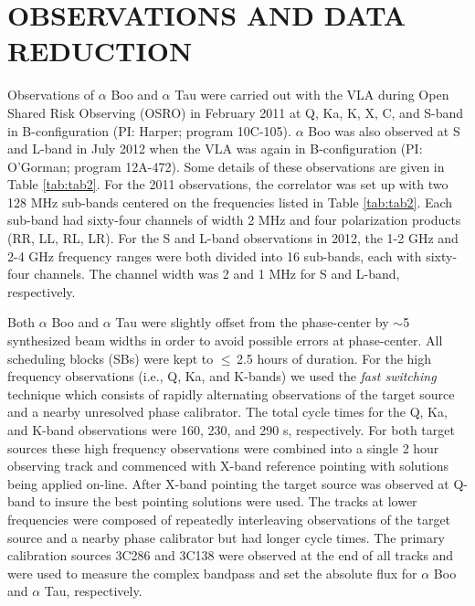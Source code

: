 \documentclass[iop]{emulateapj}
\begin{document}
\section{OBSERVATIONS AND DATA REDUCTION}

Observations of $\alpha$ Boo and $\alpha$ Tau were carried out with the VLA during Open Shared Risk Observing (OSRO) in February 2011 at Q, Ka, K, X, C, and S-band in B-configuration (PI: Harper; program 10C-105). $\alpha$ Boo was also observed at S and L-band in July 2012 when the VLA was again in B-configuration (PI: O'Gorman; program 12A-472). Some details of these observations are given in Table \ref{tab:tab2}. For the 2011 observations, the correlator was set up with two 128 MHz sub-bands centered on the frequencies listed in Table \ref{tab:tab2}. Each sub-band had sixty-four channels of width 2 MHz and four polarization products (RR, LL, RL, LR). For the S and L-band observations in 2012, the 1-2 GHz and 2-4 GHz frequency ranges were both divided into 16 sub-bands, each with sixty-four channels. The channel width was 2 and 1 MHz for S and L-band, respectively.

Both $\alpha$ Boo and $\alpha$ Tau were slightly offset from the phase-center by $\sim$5 synthesized beam widths in order to avoid possible errors at phase-center. All scheduling blocks (SBs) were kept to $\le$\,2.5 hours of duration. For the high frequency observations (i.e., Q, Ka, and K-bands) we used the \textit{fast switching} technique which consists of rapidly alternating observations of the target source and a nearby unresolved phase calibrator. The total cycle times for the Q, Ka, and K-band observations were 160, 230, and 290 s, respectively. For both target sources these high frequency observations were combined into a single 2 hour observing track and commenced with X-band reference pointing with solutions being applied on-line. After X-band pointing the target source was observed at Q-band to insure the best pointing solutions were used. The tracks at lower frequencies were composed of repeatedly interleaving observations of the target source and a nearby phase calibrator but had longer cycle times. The primary calibration sources 3C286 and 3C138 were observed at the end of all tracks and were used to measure the complex bandpass and set the absolute flux for $\alpha$ Boo and $\alpha$ Tau, respectively.  
\end{document}
